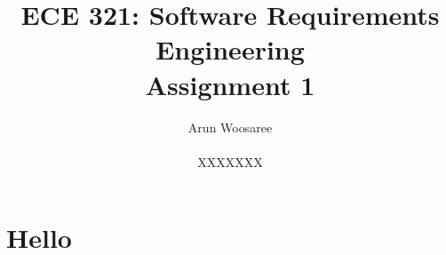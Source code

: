 \documentclass[letterpaper,12pt]{article}
\title{ECE 321: Software Requirements Engineering \\ Assignment 1}
\author{Arun Woosaree \\ \\ XXXXXXX}
\begin{document}
  \maketitle

\section{Hello}
\end{document}
